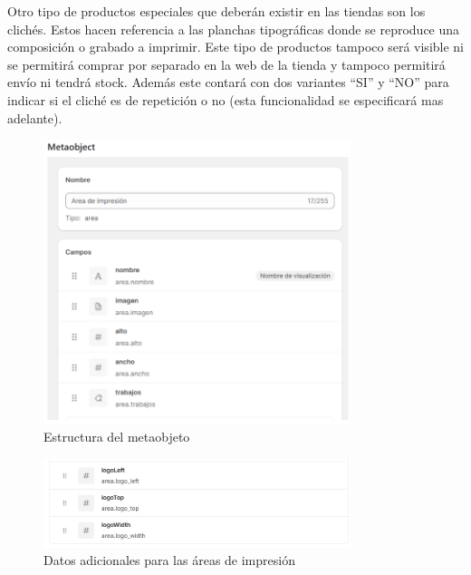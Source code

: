 \documentclass[12pt]{article}
\begin{document}
Otro tipo de productos especiales que deberán existir en las tiendas son los clichés. Estos hacen referencia a las planchas tipográficas donde se reproduce una composición o grabado
a imprimir. Este tipo de productos tampoco será visible ni se permitirá comprar por separado en la web de la tienda y tampoco permitirá envío  ni tendrá stock.
Además este contará con dos variantes ``SI'' y ``NO'' para indicar si el cliché es de repetición o no (esta funcionalidad se especificará mas adelante).


\begin{figure}[ht]
    \centering
    \includegraphics[width=0.8\textwidth]{imagenesUS2/creacionMetaobjeto.png}
    \caption{\label{fig:metaobjeto}Estructura del metaobjeto}
    \vspace{\fill}
\end{figure}

\begin{figure}[ht]
    \centering
    \includegraphics[width=0.8\textwidth]{imagenesUS2/elementosMetaobjectAdicionales.png}
    \caption{\label{fig:metaobjetoAdicional}Datos adicionales para las áreas de impresión}
    \vspace{\fill}
\end{figure}
\end{document}

